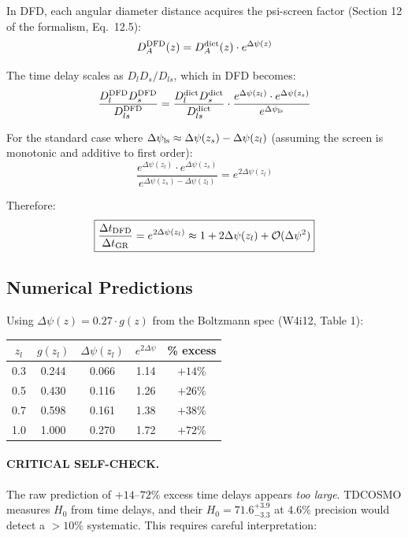 \documentclass[11pt,a4paper]{article}
\newcommand{\Dpsi}{\Delta\psi}
\begin{document}
In DFD, each angular diameter distance acquires the psi-screen
factor (Section 12 of the formalism, Eq.~12.5):
\begin{equation}
D_A^{\rm DFD}(z) = D_A^{\rm dict}(z) \cdot e^{\Dpsi(z)}
\end{equation}

The time delay scales as $D_l D_s / D_{ls}$, which in DFD becomes:
\begin{equation}
\frac{D_l^{\rm DFD} D_s^{\rm DFD}}{D_{ls}^{\rm DFD}}
= \frac{D_l^{\rm dict} D_s^{\rm dict}}{D_{ls}^{\rm dict}}
\cdot \frac{e^{\Dpsi(z_l)} \cdot e^{\Dpsi(z_s)}}{e^{\Dpsi_{\rm ls}}}
\end{equation}

For the standard case where $\Dpsi_{\rm ls} \approx \Dpsi(z_s)
- \Dpsi(z_l)$ (assuming the screen is monotonic and additive to
first order):
\begin{equation}
\frac{e^{\Dpsi(z_l)} \cdot e^{\Dpsi(z_s)}}{e^{\Dpsi(z_s) - \Dpsi(z_l)}}
= e^{2\Dpsi(z_l)}
\end{equation}

Therefore:
\begin{equation}
\boxed{
\frac{\Delta t_{\rm DFD}}{\Delta t_{\rm GR}}
= e^{2\Dpsi(z_l)}
\approx 1 + 2\Dpsi(z_l) + \mathcal{O}(\Dpsi^2)
}
\label{eq:time-delay-ratio}
\end{equation}

\subsection{Numerical Predictions}

Using $\Dpsi(z) = 0.27 \cdot g(z)$ from the Boltzmann spec
(W4i12, Table 1):

\begin{center}
\begin{tabular}{ccccc}
\toprule
$z_l$ & $g(z_l)$ & $\Dpsi(z_l)$ & $e^{2\Dpsi}$ & \% excess \\
\midrule
0.3 & 0.244 & 0.066 & 1.14 & $+14\%$ \\
0.5 & 0.430 & 0.116 & 1.26 & $+26\%$ \\
0.7 & 0.598 & 0.161 & 1.38 & $+38\%$ \\
1.0 & 1.000 & 0.270 & 1.72 & $+72\%$ \\
\bottomrule
\end{tabular}
\end{center}

\paragraph{CRITICAL SELF-CHECK.}
The raw prediction of $+14$--$72\%$ excess time delays appears
\emph{too large}.  TDCOSMO measures $H_0$ from time delays,
and their $H_0 = 71.6^{+3.9}_{-3.3}$ at $4.6\%$ precision
would detect a $> 10\%$ systematic.  This requires careful
interpretation:
\end{document}
